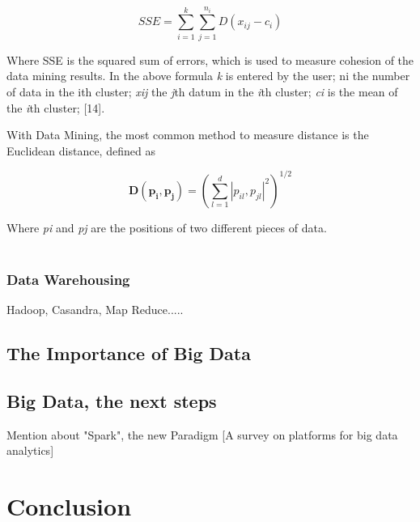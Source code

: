 \documentclass[10pt,journal,compsoc]{IEEEtran}
\begin{document}
\begin{equation}
	SSE = \sum_{i=1}^{k} \sum_{j=1}^{n_i} D( x_{ij} - c_i)
\end{equation}

Where SSE is the squared sum of errors, which is used to measure cohesion of the data mining results. In the above formula \textit{k} is entered by the user; ni the number of
data in the ith cluster; \textit{xij} the \textit{j}th datum in the \textit{i}th cluster; \textit{ci} is the mean of the \textit{i}th cluster; [14]. 

With Data Mining, the most common method to measure distance is the Euclidean distance, defined as

\begin{equation}
\mathbf{D(p_{i}, p_{j})} = 
\left(
\sum_{l=1}^{d} |p_{il}, p_{jl}|^2
\right)^{1/2}
\end{equation}

Where \textit{pi} and \textit{pj} are the positions of two different pieces of data.\\\\



\subsubsection{Data Warehousing}
Hadoop, Casandra, Map Reduce.....

\subsection{The Importance of Big Data}

\subsection{Big Data, the next steps}
Mention about "Spark", the new Paradigm [A survey on platforms for big data analytics]

\section{Conclusion}
\end{document}
